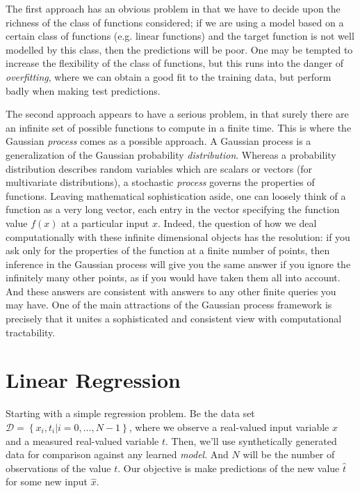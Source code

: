 \documentclass[11pt]{article} %
\begin{document}
The first approach has an obvious problem in that we have to decide upon the richness of the class of functions considered; if we are using a model based on a certain class of functions (e.g. linear functions) and the target function is not well modelled by this class, then the predictions will be poor. One may be tempted to increase the flexibility of the class of functions, but this runs into the danger of \textit{overfitting}, where we can obtain a good fit to the training data, but perform badly when making test predictions.

The second approach appears to have a serious problem, in that surely there are an infinite set of possible functions to compute in a finite time. This is where the Gaussian \textit{process} comes as a possible approach. A Gaussian process is a generalization of the Gaussian probability \textit{distribution}. Whereas a probability distribution describes random variables which are scalars or vectors (for multivariate distributions), a stochastic \textit{process} governs the properties of functions. Leaving mathematical sophistication aside, one can loosely think of a function as a very long vector, each entry in the vector specifying the function value $f(x)$ at a particular input $x$. Indeed, the question of how we deal computationally with these infinite dimensional objects has the resolution: if you ask only for the properties of the function at a finite number of points, then inference in the Gaussian process will give you the same answer if you ignore the infinitely many other points, as if you would have taken them all into account. And these answers are consistent with answers to any other finite queries you may have. One of the main attractions of the Gaussian process framework is precisely that it unites a sophisticated and consistent view with computational tractability.
\nocite{Bishop:2006:PRM:1162264}
\nocite{Rasmussen:2005:GPM:1162254}

\section{Linear Regression}

Starting with a simple regression problem. Be the data set $\mathcal{D}=\left\{ x_i,t_i|i=0,\dots,N-1 \right\}$, where we observe a real-valued input variable $x$ and a measured real-valued variable $t$. Then, we'll use synthetically generated data for comparison against any learned \textit{model}. And $N$ will be the number of observations of the value $t$. Our objective is make predictions of the new value $\hat{t}$ for some new input $\hat{x}$.
\end{document}
